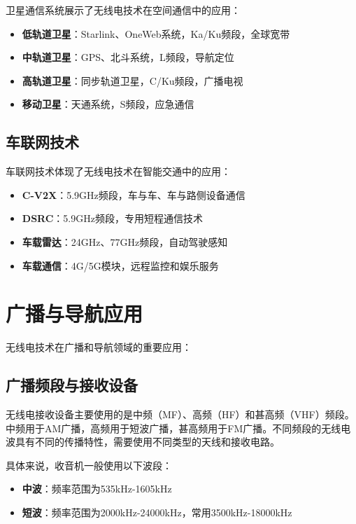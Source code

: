 \documentclass[12pt,UTF8]{ctexbook}
\begin{document}
卫星通信系统展示了无线电技术在空间通信中的应用：

\begin{itemize}[leftmargin=3.5em]
    \item \textbf{低轨道卫星}：Starlink、OneWeb系统，Ka/Ku频段，全球宽带
    \item \textbf{中轨道卫星}：GPS、北斗系统，L频段，导航定位
    \item \textbf{高轨道卫星}：同步轨道卫星，C/Ku频段，广播电视
    \item \textbf{移动卫星}：天通系统，S频段，应急通信
\end{itemize}

\subsection{车联网技术}

车联网技术体现了无线电技术在智能交通中的应用：

\begin{itemize}[leftmargin=3.5em]
    \item \textbf{C-V2X}：5.9GHz频段，车与车、车与路侧设备通信
    \item \textbf{DSRC}：5.9GHz频段，专用短程通信技术
    \item \textbf{车载雷达}：24GHz、77GHz频段，自动驾驶感知
    \item \textbf{车载通信}：4G/5G模块，远程监控和娱乐服务
\end{itemize}

\section{广播与导航应用}

无线电技术在广播和导航领域的重要应用：

\subsection{广播频段与接收设备}

无线电接收设备主要使用的是中频（MF）、高频（HF）和甚高频（VHF）频段。中频用于AM广播，高频用于短波广播，甚高频用于FM广播。不同频段的无线电波具有不同的传播特性，需要使用不同类型的天线和接收电路。

具体来说，收音机一般使用以下波段：
\begin{itemize}[leftmargin=3.5em]
    \item \textbf{中波}：频率范围为535kHz-1605kHz
    \item \textbf{短波}：频率范围为2000kHz-24000kHz，常用3500kHz-18000kHz
\end{itemize}
\end{document}
